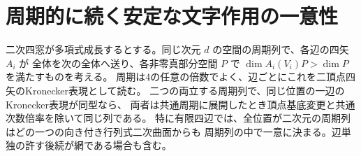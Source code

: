 \section{周期的に続く安定な文字作用の一意性}
\label{sec:periodic-stable-arrow-uniqueness}
\begin{theorem}\label{thm:periodic-stable-arrow-uniqueness}
二次四窓が多項式成長するとする。同じ次元 $d$ の空間の周期列で、各辺の四矢 $A_i$ が
全体を次の全体へ送り、各非零真部分空間 $P$ で $\dim A_i(V_i)P>\dim P$ を満たすものを考える。
周期は4の任意の倍数でよく、辺ごとにこれを二頂点四矢のKronecker表現として読む。
二つの両立する周期列で、同じ位置の一辺のKronecker表現が同型なら、
両者は共通周期に展開したとき頂点基底変更と共通次数倍率を除いて同じ列である。
特に有限四辺では、全位置が二次元の周期列はどの一つの向き付き行列式二次曲面からも
周期列の中で一意に決まる。辺単独の許す後続が網である場合も含む。
\end{theorem}
